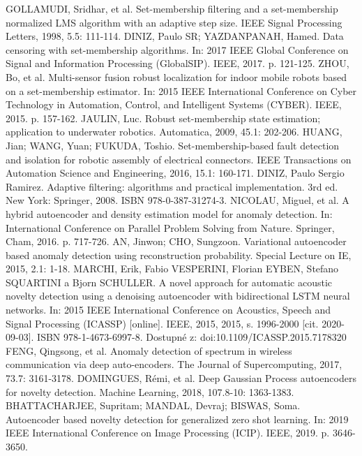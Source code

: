 \documentclass[11pt,twoside,openright]{report}
\begin{document}
\begin{thebibliography}{L}
GOLLAMUDI, Sridhar, et al. Set-membership filtering and a set-membership normalized LMS algorithm with an adaptive step size. IEEE Signal Processing Letters, 1998, 5.5: 111-114.
DINIZ, Paulo SR; YAZDANPANAH, Hamed. Data censoring with set-membership algorithms. In: 2017 IEEE Global Conference on Signal and Information Processing (GlobalSIP). IEEE, 2017. p. 121-125.
ZHOU, Bo, et al. Multi-sensor fusion robust localization for indoor mobile robots based on a set-membership estimator. In: 2015 IEEE International Conference on Cyber Technology in Automation, Control, and Intelligent Systems (CYBER). IEEE, 2015. p. 157-162.
JAULIN, Luc. Robust set-membership state estimation; application to underwater robotics. Automatica, 2009, 45.1: 202-206.
HUANG, Jian; WANG, Yuan; FUKUDA, Toshio. Set-membership-based fault detection and isolation for robotic assembly of electrical connectors. IEEE Transactions on Automation Science and Engineering, 2016, 15.1: 160-171.
DINIZ, Paulo Sergio Ramirez. Adaptive filtering: algorithms and practical implementation. 3rd ed. New York: Springer, 2008. ISBN 978-0-387-31274-3.
NICOLAU, Miguel, et al. A hybrid autoencoder and density estimation model for anomaly detection. In: International Conference on Parallel Problem Solving from Nature. Springer, Cham, 2016. p. 717-726.
AN, Jinwon; CHO, Sungzoon. Variational autoencoder based anomaly detection using reconstruction probability. Special Lecture on IE, 2015, 2.1: 1-18.
MARCHI, Erik, Fabio VESPERINI, Florian EYBEN, Stefano SQUARTINI a Bjorn SCHULLER. A novel approach for automatic acoustic novelty detection using a denoising autoencoder with bidirectional LSTM neural networks. In: 2015 IEEE International Conference on Acoustics, Speech and Signal Processing (ICASSP) [online]. IEEE, 2015, 2015, s. 1996-2000 [cit. 2020-09-03]. ISBN 978-1-4673-6997-8. Dostupné z: doi:10.1109/ICASSP.2015.7178320
FENG, Qingsong, et al. Anomaly detection of spectrum in wireless communication via deep auto-encoders. The Journal of Supercomputing, 2017, 73.7: 3161-3178.
DOMINGUES, Rémi, et al. Deep Gaussian Process autoencoders for novelty detection. Machine Learning, 2018, 107.8-10: 1363-1383.
BHATTACHARJEE, Supritam; MANDAL, Devraj; BISWAS, Soma. Autoencoder based novelty detection for generalized zero shot learning. In: 2019 IEEE International Conference on Image Processing (ICIP). IEEE, 2019. p. 3646-3650.

\end{thebibliography}
\end{document}
